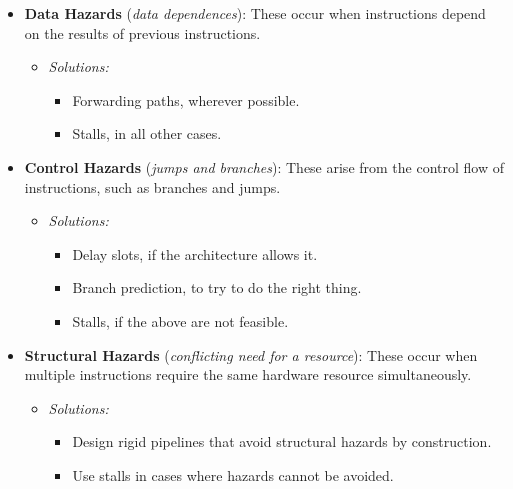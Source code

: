 \begin{itemize}
    \item \textbf{Data Hazards} (\textit{data dependences}): These occur when instructions depend on the results of previous instructions.
    \begin{itemize}
        \item \textit{Solutions:}
        \begin{itemize}
            \item Forwarding paths, wherever possible.
            \item Stalls, in all other cases.
        \end{itemize}
    \end{itemize}

    \item \textbf{Control Hazards} (\textit{jumps and branches}): These arise from the control flow of instructions, such as branches and jumps.
    \begin{itemize}
        \item \textit{Solutions:}
        \begin{itemize}
            \item Delay slots, if the architecture allows it.
            \item Branch prediction, to try to do the right thing.
            \item Stalls, if the above are not feasible.
        \end{itemize}
    \end{itemize}

    \item \textbf{Structural Hazards} (\textit{conflicting need for a resource}): These occur when multiple instructions require the same hardware resource simultaneously.
    \begin{itemize}
        \item \textit{Solutions:}
        \begin{itemize}
            \item Design rigid pipelines that avoid structural hazards by construction.
            \item Use stalls in cases where hazards cannot be avoided.
        \end{itemize}
    \end{itemize}
\end{itemize}

